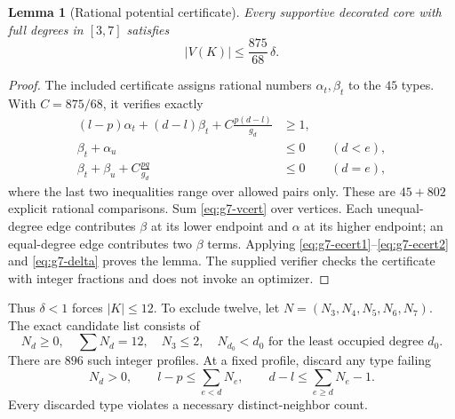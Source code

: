 \documentclass[11pt,a4paper]{article}
\newtheorem{lemma}[theorem]{Lemma}
\theoremstyle{definition}\newtheorem{definition}[theorem]{Definition}
\theoremstyle{remark}\newtheorem{remark}[theorem]{Remark}
\begin{document}
\begin{lemma}[Rational potential certificate]\label{lem:g7-potential}
Every supportive decorated core with full degrees in $[3,7]$ satisfies
\[
 |V(K)|\le\frac{875}{68}\,\delta.
\]
\end{lemma}
\begin{proof}
The included certificate assigns rational numbers $\alpha_t,\beta_t$
to the $45$ types. With $C=875/68$, it verifies exactly
\begin{align}
 (l-p)\alpha_t+(d-l)\beta_t+C\frac{p(d-l)}{g_d}&\ge1,
                                                    \label{eq:g7-vcert}\\
 \beta_t+\alpha_u&\le0 &&(d<e),\label{eq:g7-ecert1}\\
 \beta_t+\beta_u+C\frac{pq}{g_d}&\le0 &&(d=e),\label{eq:g7-ecert2}
\end{align}
where the last two inequalities range over allowed pairs only.
These are $45+802$ explicit rational comparisons. Sum
\eqref{eq:g7-vcert} over vertices. Each unequal-degree edge contributes
$\beta$ at its lower endpoint and $\alpha$ at its higher endpoint;
an equal-degree edge contributes two $\beta$ terms. Applying
\eqref{eq:g7-ecert1}--\eqref{eq:g7-ecert2} and
\eqref{eq:g7-delta} proves the lemma. The supplied verifier checks the
certificate with integer fractions and does not invoke an optimizer.
\end{proof}

Thus $\delta<1$ forces $|K|\le12$. To exclude twelve, let
$N=(N_3,N_4,N_5,N_6,N_7)$. The exact candidate list consists of
\begin{equation}\label{eq:g7-profiles}
 N_d\ge0,\quad\sum N_d=12,\quad N_3\le2,
 \quad N_{d_0}<d_0\text{ for the least occupied degree }d_0.
\end{equation}
There are $896$ such integer profiles. At a fixed profile, discard
any type failing
\begin{equation}\label{eq:g7-typefilter}
 N_d>0,\qquad l-p\le\sum_{e<d}N_e,
 \qquad d-l\le\sum_{e\ge d}N_e-1.
\end{equation}
Every discarded type violates a necessary distinct-neighbor count.
\end{document}
